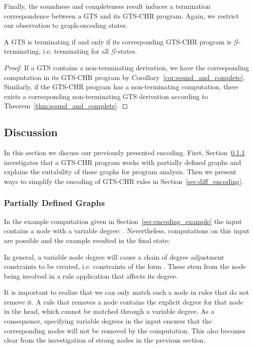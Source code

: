 \documentclass{tlp}
\newcommand{\mcG}{\ensuremath{\mathcal{G}}}
\begin{document}
Finally, the soundness and completeness result induces a termination
correspondence between a GTS and its GTS-CHR program. Again, we restrict our
observation to graph-encoding states.

\begin{corollary}\label{cor:termination} A GTS is
terminating if and only if its corresponding GTS-CHR program is \mcG-terminating,
i.e. terminating for all \mcG-states.
\begin{proof}
If a GTS contains a non-terminating derivation, we have the corresponding
computation in its GTS-CHR program by Corollary~\ref{cor:sound_and_complete}.
Similarly, if the GTS-CHR program has a non-terminating computation, there
exists a corresponding non-terminating GTS derivation according to
Theorem~\ref{thm:sound_and_complete}.
\end{proof}
\end{corollary}

\subsection{Discussion}
\label{sec:encoding_discussion}

In this section we discuss our previously presented encoding. First,
Section~\ref{sec:partial} investigates that a GTS-CHR program works with
partially defined graphs and explains the suitability of these graphs for program
analysis. Then we present ways to simplify the encoding of GTS-CHR rules in
Section~\ref{sec:diff_encoding}.

\subsubsection{Partially Defined Graphs}
\label{sec:partial}

In the example computation given in Section~\ref{sec:encoding_example} the input
contains a node with a variable degree: . Nevertheless,
computations on this input are possible and the example resulted in the final
state: 

In general, a variable node degree will cause a chain of degree adjustment
constraints to be created, i.e. constraints of the form .
These stem from the node being involved in a rule application that affects its
degree.

It is important to realize that we can only match such a node in rules that do
not remove it. A rule that removes a node contains the explicit degree for that
node in the head, which cannot be matched through a variable degree. As a
consequence, specifying variable degrees in the input ensures that the
corresponding nodes will not be removed by the computation. This also becomes
clear from the investigation of strong nodes in the previous section.
\end{document}
